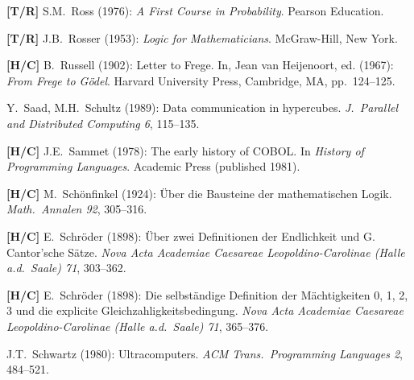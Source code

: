 \begin{thebibliography}{999}



{\bf [T/R]}
S.M.~Ross (1976): {\it A First Course in Probability}.  Pearson Education.

{\bf [T/R]}
J.B.~Rosser (1953): {\it Logic for Mathematicians}. McGraw-Hill, New York.

{\bf [H/C]}
B.~Russell (1902): Letter to Frege.  In, Jean van Heijenoort, ed. (1967):  {\it From Frege to G\"{o}del}.  Harvard University Press, Cambridge, MA, pp.~124--125.


Y.~Saad, M.H.~Schultz (1989): Data communication in hypercubes.  {\it J.~Parallel and Distributed Computing 6}, 115--135.


{\bf [H/C]}
J.E.~Sammet (1978): The early history of COBOL.  In {\it History of Programming Languages}.  Academic Press (published 1981).

{\bf [H/C]}
M.~Sch\"onfinkel (1924): \"{U}ber die Bausteine der mathematischen Logik.  {\it Math.~Annalen 92}, 305--316.

{\bf [H/C]}
E.~Schr\"{o}der (1898): \"{U}ber zwei Definitionen der Endlichkeit und G. Cantor'sche S\"{a}tze.  {\it Nova Acta Academiae Caesareae Leopoldino-Carolinae (Halle a.d.~Saale) 71}, 303--362.

{\bf [H/C]}
E.~Schr\"{o}der (1898): Die selbst\"{a}ndige Definition der M\"{a}chtigkeiten 0, 1, 2, 3 und die explicite Gleichzahligkeitsbedingung.  {\it Nova Acta Academiae Caesareae
Leopoldino-Carolinae (Halle a.d.~Saale) 71}, 365--376.

J.T.~Schwartz (1980): Ultracomputers.  {\it ACM Trans.~Programming Languages 2}, 484--521.


\end{thebibliography}
